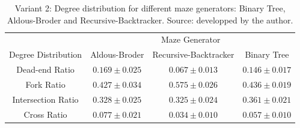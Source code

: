      \begin{table}[!h]
        \begin{center} 
            \caption{Variant 2: Degree distribution for different maze generators: Binary Tree, Aldous-Broder and Recursive-Backtracker. Source: developped by the author.} 
        \begin{tabular}{ c c c c} \hline
        ~&\multicolumn{3}{c}{Maze Generator} \\
    Degree Distribution&Aldous-Broder&Recursive-Backtracker&Binary Tree\\
        \hline \hline
    Dead-end Ratio&$0.169\pm 0.025$&$0.067\pm 0.013$&$0.146\pm 0.017$\\    
        \hline
    Fork Ratio&$0.427\pm 0.034$&$0.575\pm 0.026$&$0.436\pm 0.019$\\ 
        \hline
    Intersection Ratio&$0.328\pm 0.025$&$0.325\pm 0.024$&$0.361\pm 0.021$\\   
        \hline
    Cross Ratio&$0.077\pm 0.021$&$0.034\pm 0.010$&$0.057\pm 0.010$\\   
        \hline   
         \end{tabular} 
        \end{center}
         \end{table}
         \newpage
